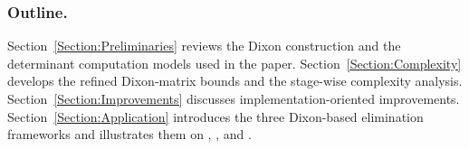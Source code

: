 \subsubsection{Outline.}
Section~\ref{Section:Preliminaries} reviews the Dixon construction and the determinant computation models used in the paper. Section~\ref{Section:Complexity} develops the refined Dixon-matrix bounds and the stage-wise complexity analysis. Section~\ref{Section:Improvements} discusses implementation-oriented improvements. Section~\ref{Section:Application} introduces the three Dixon-based elimination frameworks and illustrates them on \poseidon, \vision, and \xhash.